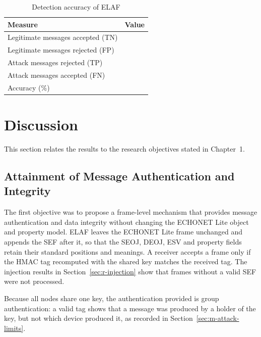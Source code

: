 \begin{table}[htbp]
  \centering
  \caption{Detection accuracy of ELAF}
  \label{tab:r-acc}
  \renewcommand{\arraystretch}{1.2}
  \begin{tabularx}{\textwidth}{@{}X c@{}}
    \toprule
    \textbf{Measure}                                  & \textbf{Value} \\
    \midrule
    Legitimate messages accepted (TN)                 & \tbd{}         \\
    Legitimate messages rejected (FP)                 & \tbd{}         \\
    Attack messages rejected (TP)                     & \tbd{}         \\
    Attack messages accepted (FN)                     & \tbd{}         \\
    Accuracy (\%)                                     & \tbd{}         \\
    \bottomrule
  \end{tabularx}
\end{table}

\section{Discussion}
\label{sec:r-disc}

This section relates the results to the research objectives stated in Chapter~1.

\subsection{Attainment of Message Authentication and Integrity}

The first objective was to propose a frame-level mechanism that provides message authentication and data integrity without changing the ECHONET Lite object and property model. ELAF leaves the ECHONET Lite frame unchanged and appends the SEF after it, so that the SEOJ, DEOJ, ESV and property fields retain their standard positions and meanings. A receiver accepts a frame only if the HMAC tag recomputed with the shared key matches the received tag. The injection results in Section~\ref{sec:r-injection} show that frames without a valid SEF were not processed.

Because all nodes share one key, the authentication provided is group authentication: a valid tag shows that a message was produced by a holder of the key, but not which device produced it, as recorded in Section~\ref{sec:m-attack-limits}.

